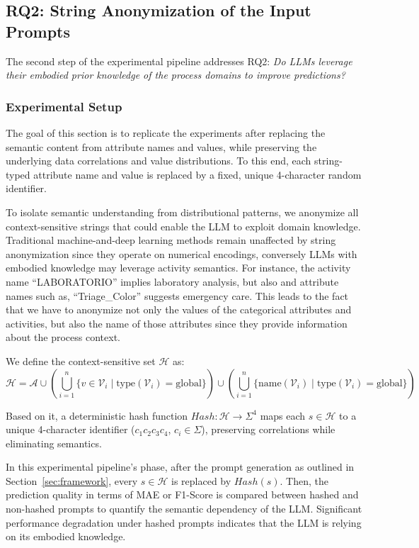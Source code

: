 \documentclass[manuscript,screen,review]{acmart}
\newcommand{\MA}{\mathcal{A}}
\newcommand{\MV}{\mathcal{V}}
\newcommand{\MH}{\mathcal{H}}
\begin{document}
\subsection{RQ2: String Anonymization of the Input Prompts}\label{subsec:rq2}
The second step of the experimental pipeline addresses RQ2: \textit{Do LLMs leverage their embodied prior knowledge of the process domains to improve predictions?}


\subsubsection{Experimental Setup}
The goal of this section is to replicate the experiments after replacing the semantic content from attribute names and values, while preserving the underlying data correlations and value distributions. To this end, each string-typed attribute name and value is replaced by a fixed, unique 4-character random identifier.

To isolate semantic understanding from distributional patterns, we anonymize all context-sensitive strings that could enable the LLM to exploit domain knowledge. Traditional machine-and-deep learning methods remain unaffected by string anonymization since they operate on numerical encodings, conversely LLMs with embodied knowledge may leverage activity semantics. For instance, the activity name “LABORATORIO” implies laboratory analysis, but also and attribute names such as, “Triage\_Color” suggests emergency care. This leads to the fact that we have to anonymize not only the values of the categorical attributes and activities, but also the name of those attributes since they provide information about the process context.

We define the context-sensitive set $\MH$ as:
\begin{equation}
\MH = \MA \cup \left( \bigcup_{i=1}^n \{v \in \MV_i \mid \text{type}(\MV_i)=\text{global}\} \right) \cup \left( \bigcup_{i=1}^n \{\text{name}(\MV_i) \mid \text{type}(\MV_i)=\text{global}\} \right)
\end{equation}

Based on it, a deterministic hash function $Hash: \MH \to \Sigma^4$ maps each $s \in \MH$ to a unique 4-character identifier ($c_1c_2c_3c_4$, $c_i \in \Sigma$), preserving correlations while eliminating semantics. 

In this experimental pipeline's phase, after the prompt generation as outlined in Section~\ref{sec:framework}, every $s \in \MH$ is replaced by $Hash(s)$. Then, the prediction quality in terms of MAE or F1-Score is compared between hashed and non-hashed prompts to quantify the semantic dependency of the LLM. Significant performance degradation under hashed prompts indicates that the LLM is relying on its embodied knowledge. 
\end{document}
